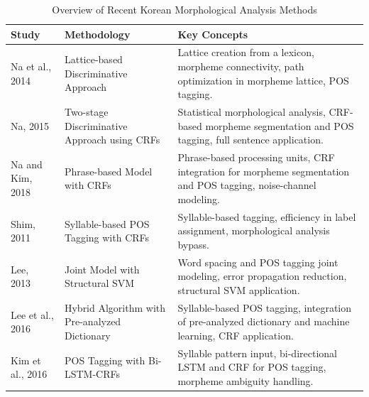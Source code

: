 \documentclass[AMS,STIX2COL]{WileyNJD-v2}
\begin{document}
    \begin{table}[h!]
        \centering
        \footnotesize %
        \caption{Overview of Recent Korean Morphological Analysis Methods}
        \label{tab:overview-of-recent-korean-morphological-analysis-methods}
        \begin{tabular}{|p{10mm}|p{24mm}|p{40mm}|}
            \hline
            \textbf{Study}                        & \textbf{Methodology}                                   & \textbf{Key Concepts}                                                                                             \\
            \hline
            Na et al., 2014~\cite{NaSH2014}       & Lattice-based Discriminative Approach                  & Lattice creation from a lexicon, morpheme connectivity, path optimization in morpheme lattice, POS tagging.       \\
            \hline
            Na, 2015~\cite{NaSH2015}              & Two-stage Discriminative Approach using CRFs           & Statistical morphological analysis, CRF-based morpheme segmentation and POS tagging, full sentence application.   \\
            \hline
            Na and Kim, 2018~\cite{NaSH2018}      & Phrase-based Model with CRFs                           & Phrase-based processing units, CRF integration for morpheme segmentation and POS tagging, noise-channel modeling. \\
            \hline
            Shim, 2011~\cite{ShimKS2011}          & Syllable-based POS Tagging with CRFs                   & Syllable-based tagging, efficiency in label assignment, morphological analysis bypass.                            \\
            \hline
            Lee, 2013~\cite{LeeCK2013}            & Joint Model with Structural SVM                        & Word spacing and POS tagging joint modeling, error propagation reduction, structural SVM application.             \\
            \hline
            Lee et al., 2016~\cite{LeeCH2016}     & Hybrid Algorithm with Pre-analyzed Dictionary          & Syllable-based POS tagging, integration of pre-analyzed dictionary and machine learning, CRF application.         \\
            \hline
            Kim et al., 2016~\cite{KimHM2016}     & POS Tagging with Bi-LSTM-CRFs                          & Syllable pattern input, bi-directional LSTM and CRF for POS tagging, morpheme ambiguity handling.                 \\

\end{tabular}
\end{table}
\end{document}
